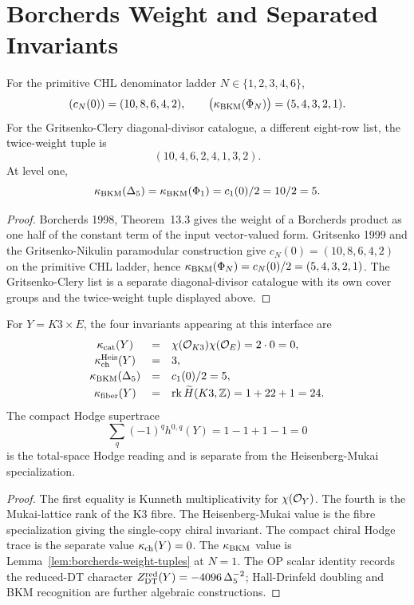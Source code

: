 \section{Borcherds Weight and Separated Invariants}
\label{sec:igusa-borcherds-normalizations}

\begin{lemma}
\label{lem:borcherds-weight-tuples}
For the primitive CHL denominator ladder $N\in\{1,2,3,4,6\}$,
\[
  (c_N(0))=(10,8,6,4,2),
  \qquad
  \bigl(\kappa_{\mathrm{BKM}}(\Phi_N)\bigr)=(5,4,3,2,1).
\]
For the Gritsenko-Clery diagonal-divisor catalogue, a different
eight-row list, the twice-weight tuple is
\[
  (10,4,6,2,4,1,3,2).
\]
At level one,
\[
  \kappa_{\mathrm{BKM}}(\Delta_5)=\kappa_{\mathrm{BKM}}(\Phi_1)=c_1(0)/2=10/2=5.
\]
\end{lemma}

\begin{proof}
Borcherds 1998, Theorem~13.3 gives the weight of a Borcherds product as
one half of the constant term of the input vector-valued form. Gritsenko
1999 and the Gritsenko-Nikulin paramodular construction give
$c_N(0)=(10,8,6,4,2)$ on the primitive CHL ladder, hence
$\kappa_{\mathrm{BKM}}(\Phi_N)=c_N(0)/2=(5,4,3,2,1)$. The Gritsenko-Clery list is a
separate diagonal-divisor catalogue with its own cover groups and the
twice-weight tuple displayed above.
\end{proof}

\begin{corollary}
\label{cor:k3e-four-invariants-from-character}
For \(Y=K3\times E\), the four invariants appearing at this interface
are
\[
\begin{array}{ccl}
 \kappa_{\mathrm{cat}}(Y) &=& \chi(\mathcal{O}_{K3})\chi(\mathcal{O}_E)=2\cdot0=0,\\[2pt]
 \kappa_{\mathrm{ch}}^{\mathrm{Heis}}(Y) &=& 3,\\[2pt]
 \kappa_{\mathrm{BKM}}(\Delta_5) &=& c_1(0)/2=5,\\[2pt]
 \kappa_{\mathrm{fiber}}(Y) &=& \mathrm{rk}\,\widetilde H(K3,\mathbb{Z})=1+22+1=24.
\end{array}
\]
The compact Hodge supertrace
\[
  \sum_q(-1)^q h^{0,q}(Y)=1-1+1-1=0
\]
is the total-space Hodge reading and is separate from the
Heisenberg-Mukai specialization.
\end{corollary}

\begin{proof}
The first equality is Kunneth multiplicativity for
$\chi(\mathcal{O}_Y)$. The fourth is the Mukai-lattice rank of the K3 fibre. The
Heisenberg-Mukai value is the fibre specialization giving the
single-copy chiral invariant. The compact chiral Hodge trace is the
separate value \(\kappa_{\mathrm{ch}}(Y)=0\).
The \(\kappa_{\mathrm{BKM}}\) value is Lemma~\ref{lem:borcherds-weight-tuples} at
\(N=1\). The OP scalar
identity records the reduced-DT character
$Z^{\mathrm{red}}_{\mathrm{DT}}(Y)=-4096\,\Delta_5^{-2}$; Hall-Drinfeld doubling and BKM
recognition are further algebraic constructions.
\end{proof}

